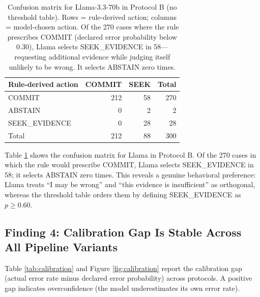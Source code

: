 \documentclass[11pt]{article}
\begin{document}
\begin{table}[h]
\centering
\small
\begin{tabular}{lrrr}
\toprule
\textbf{Rule-derived action} & \textbf{COMMIT} & \textbf{SEEK} & \textbf{Total} \\
\midrule
COMMIT         & 212 & 58 & 270 \\
ABSTAIN        &   0 &  2 &   2 \\
SEEK\_EVIDENCE &   0 & 28 &  28 \\
\midrule
Total          & 212 & 88 & 300 \\
\bottomrule
\end{tabular}
\caption{Confusion matrix for Llama-3.3-70b in Protocol B (no threshold table). Rows = rule-derived action; columns = model-chosen action. Of the 270 cases where the rule prescribes COMMIT (declared error probability below 0.30), Llama selects SEEK\_EVIDENCE in 58---requesting additional evidence while judging itself unlikely to be wrong. It selects ABSTAIN zero times.}
\label{tab:confusion}
\end{table}

Table \ref{tab:confusion} shows the confusion matrix for Llama in Protocol B. Of the 270 cases in which the rule would prescribe COMMIT, Llama selects SEEK\_EVIDENCE in 58; it selects ABSTAIN zero times. This reveals a genuine behavioral preference: Llama treats ``I may be wrong'' and ``this evidence is insufficient'' as orthogonal, whereas the threshold table orders them by defining SEEK\_EVIDENCE as $p \ge 0.60$.

\subsection{Finding 4: Calibration Gap Is Stable Across All Pipeline Variants}
\label{sec:calibration}

Table \ref{tab:calibration} and Figure \ref{fig:calibration} report the calibration gap (actual error rate minus declared error probability) across protocols. A positive gap indicates overconfidence (the model underestimates its own error rate).
\end{document}
